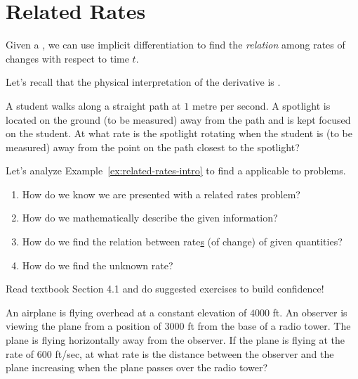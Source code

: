 \documentclass[../main.tex]{subfiles}
\begin{document}
 \section{Related Rates}
  Given a , we can use implicit differentiation  to find the \emph{relation} among rates of changes with respect to time \(t\).

  Let's recall that the physical interpretation of the derivative is .
  \begin{example} \label{ex:related-rates-intro}
    A student walks along a straight path at \(1\) metre per second.  A spotlight is located on the ground (to be measured) \underline{\hspace{1in}} away from the path and is kept focused on the student. At what rate is the spotlight rotating when the student is (to be measured) \underline{\hspace{1in}} away from the point on the path closest to the spotlight?
  \end{example}

  Let's analyze Example~\ref{ex:related-rates-intro} to find a  applicable to   problems. 
  \begin{enumerate}
    \item How do we know we are presented with a related rates problem?

    \item How do we mathematically describe the given information?

    \item How do we find the relation between rate\underline{s} (of change) of given quantities?

    \item How do we find the unknown rate?
  \end{enumerate}

  \faStar{} Read textbook Section 4.1 and do suggested exercises to build confidence!

  \clearpage
  \begin{example}
    An airplane is flying overhead at a constant elevation of \(4000\) ft. An observer is viewing the plane from a position of \(3000\) ft from the base of a radio tower. The plane is flying horizontally away from the observer. If the plane is flying at the rate of \(600\) ft/sec, at what rate is the distance between the observer and the plane increasing when the plane passes over the radio tower?

  \end{example}
  \clearpage
\end{document}

